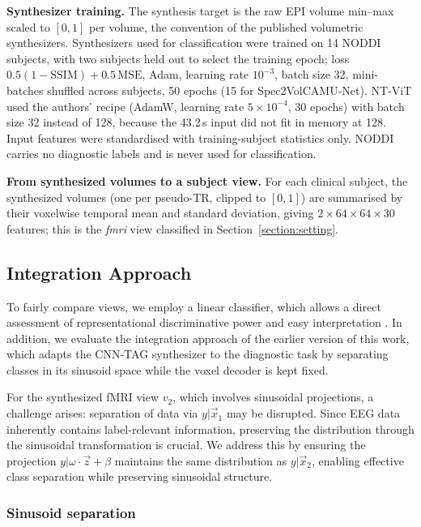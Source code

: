 \documentclass{article}
\begin{document}
\noindent\textbf{Synthesizer training.} The synthesis target is the raw EPI volume min--max scaled to $[0,1]$ per volume, the convention of the published volumetric synthesizers. Synthesizers used for classification were trained on 14 NODDI subjects, with two subjects held out to select the training epoch; loss $0.5(1-\mathrm{SSIM})+0.5\,\mathrm{MSE}$, Adam, learning rate $10^{-3}$, batch size 32, mini-batches shuffled across subjects, 50 epochs (15 for Spec2VolCAMU-Net). NT-ViT used the authors' recipe (AdamW, learning rate $5\times10^{-4}$, 30 epochs) with batch size 32 instead of 128, because the 43.2\,s input did not fit in memory at 128. Input features were standardised with training-subject statistics only. NODDI carries no diagnostic labels and is never used for classification.

\noindent\textbf{From synthesized volumes to a subject view.} For each clinical subject, the synthesized volumes (one per pseudo-TR, clipped to $[0,1]$) are summarised by their voxelwise temporal mean and standard deviation, giving $2\times64\times64\times30$ features; this is the \textit{fmri} view classified in Section~\ref{section:setting}.

\subsection{Integration Approach}\label{section:integration}

To fairly compare views, we employ a linear classifier, which allows a direct assessment of representational discriminative power and easy interpretation \cite{treviso2020explanation}. In addition, we evaluate the integration approach of the earlier version of this work, which adapts the CNN-TAG synthesizer to the diagnostic task by separating classes in its sinusoid space while the voxel decoder is kept fixed.

For the synthesized fMRI view $v_2$, which involves sinusoidal projections, a challenge arises: separation of data via $y|\vec{x}_1$ may be disrupted. Since EEG data inherently contains label-relevant information, preserving the distribution through the sinusoidal transformation is crucial. We address this by ensuring the projection $y|\omega \cdot \vec{z} + \beta$ maintains the same distribution as $y|\vec{x}_2$, enabling effective class separation while preserving sinusoidal structure.

\subsubsection{Sinusoid separation}\label{methods:separation}
\end{document}
